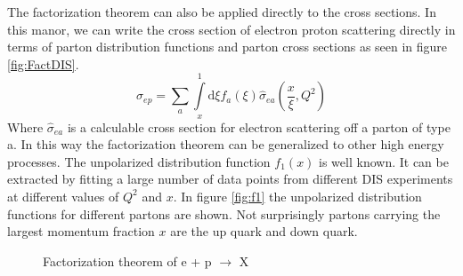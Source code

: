 \documentclass[abstract = on,listof=totoc, bibliography=totoc]{scrreprt}
\begin{document}
The factorization theorem can also be applied directly to the cross sections. In this manor, we can write the cross section of electron proton scattering directly in terms of parton distribution functions and parton cross sections as seen in figure \ref{fig:FactDIS}.
\begin{equation}
\sigma_{ep} = \sum\limits_a \int\limits_x^1 \text{d}\xi f_a(\xi) \hat{\sigma}_{ea}\left(\frac{x}{\xi},Q^2\right)
\end{equation}
Where $\hat{\sigma}_{ea}$ is a calculable cross section for electron scattering off a parton of type a. In this way the factorization theorem can be generalized to other high energy processes.\cite{factorization}
The unpolarized distribution function $f_1(x)$ is well known. It can be extracted by fitting a large number of data points from different DIS experiments at different values of $Q^2$ and $x$.\cite{unpolDisFuncPic} In figure \ref{fig:f1} the unpolarized distribution functions for different partons are shown. Not surprisingly partons carrying the largest momentum fraction $x$ are the up quark and down quark. 
\begin{figure}[!tbp]
  \centering
  \hfill
  \caption{Factorization theorem of e + p $\rightarrow$ X}
\end{figure}
\end{document}
